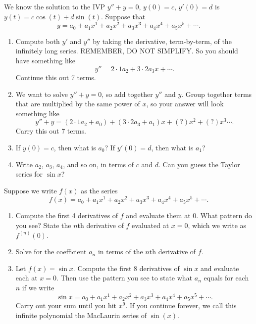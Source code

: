 \begin{problem}
 We know the solution to the IVP $y''+y=0$, $y(0)=c$, $y'(0)=d$ is $y(t)=c\cos(t)+d\sin(t)$. Suppose that
 $$y =  a_0+a_1x^1+a_2x^2+a_3x^3+a_4x^4 + a_5x^5 + \cdots.$$
\begin{enumerate}
 \item Compute both $y'$ and $y''$ by taking the derivative, term-by-term, of the infinitely long series.  REMEMBER, DO NOT SIMPLIFY.  So you should have something like $$y'' = 2\cdot 1 a_2+ 3\cdot 2a_3x+\cdots.$$ Continue this out 7 terms.
 \item We want to solve $y''+y=0$, so add together $y''$ and $y$.  Group together terms that are multiplied by the same power of $x$, so your answer will look something like 
$$y''+y = (2\cdot 1 a_2+a_0) + (3\cdot 2a_3+a_1)x+(?)x^2+(?)x^3\cdots.$$
Carry this out 7 terms.
 \item If $y(0)=c$, then what is $a_0$?  If $y'(0)=d$, then what is $a_1$? 
 \item Write $a_2$, $a_3$, $a_4$, and so on, in terms of $c$ and $d$. Can you guess the Taylor series for $\sin x$? 
\end{enumerate}

\end{problem}


\begin{problem}
 Suppose we write $f(x)$ as the series $$f(x)=a_0+a_1x^1+a_2x^2+a_3x^3+a_4x^4 + a_5x^5 + \cdots.$$
 \begin{enumerate}
  \item Compute the first 4 derivatives of $f$ and evaluate them at $0$.  What pattern do you see?  State the $n$th derivative of $f$ evaluated at $x=0$, which we write as $f^{(n)}(0)$. 
 \item Solve for the coefficient $a_n$ in terms of the $n$th derivative of $f$.
 \item Let $f(x)=\sin x$.  Compute the first 8 derivatives of $\sin x$ and evaluate each at $x=0$.  Then use the pattern you see to state what $a_n$ equals for each $n$ if we write $$\sin x = a_0+a_1x^1+a_2x^2+a_3x^3+a_4x^4 + a_5x^5 + \cdots.$$ Carry out your sum until you hit $x^9$. If you continue forever, we call this infinite polynomial the MacLaurin series of $\sin(x)$.  
 \end{enumerate}

\end{problem}

